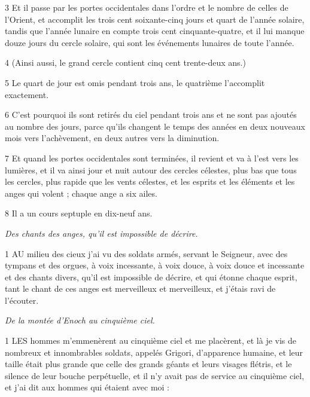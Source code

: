 \par 3 Et il passe par les portes occidentales dans l'ordre et le nombre de celles de l'Orient, et accomplit les trois cent soixante-cinq jours et quart de l'année solaire, tandis que l'année lunaire en compte trois cent cinquante-quatre, et il lui manque douze jours du cercle solaire, qui sont les événements lunaires de toute l'année.

\par 4 (Ainsi aussi, le grand cercle contient cinq cent trente-deux ans.)

\par 5 Le quart de jour est omis pendant trois ans, le quatrième l'accomplit exactement.

\par 6 C'est pourquoi ils sont retirés du ciel pendant trois ans et ne sont pas ajoutés au nombre des jours, parce qu'ils changent le temps des années en deux nouveaux mois vers l'achèvement, en deux autres vers la diminution.

\par 7 Et quand les portes occidentales sont terminées, il revient et va à l'est vers les lumières, et il va ainsi jour et nuit autour des cercles célestes, plus bas que tous les cercles, plus rapide que les vents célestes, et les esprits et les éléments et les anges qui volent ; chaque ange a six ailes.

\par 8 Il a un cours septuple en dix-neuf ans.


\par \textit{Des chants des anges, qu'il est impossible de décrire.}

\par 1 AU milieu des cieux j'ai vu des soldats armés, servant le Seigneur, avec des tympans et des orgues, à voix incessante, à voix douce, à voix douce et incessante et des chants divers, qu'il est impossible de décrire, et qui étonne chaque esprit, tant le chant de ces anges est merveilleux et merveilleux, et j'étais ravi de l'écouter.


\par \textit{De la montée d'Enoch au cinquième ciel.}

\par 1 LES hommes m'emmenèrent au cinquième ciel et me placèrent, et là je vis de nombreux et innombrables soldats, appelés Grigori, d'apparence humaine, et leur taille était plus grande que celle des grands géants et leurs visages flétris, et le silence de leur bouche perpétuelle, et il n'y avait pas de service au cinquième ciel, et j'ai dit aux hommes qui étaient avec moi :

